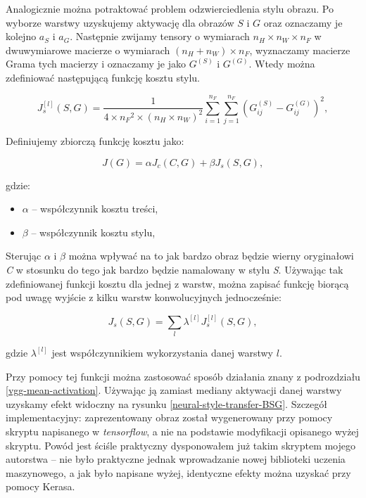 Analogicznie można potraktować problem odzwierciedlenia stylu obrazu. Po wyborze warstwy uzyskujemy aktywację dla obrazów \(S\) i \(G\) oraz oznaczamy je kolejno \(a_{S}\) i \(a_{G}\). 
Następnie zwijamy tensory o wymiarach \(n_H \times n_W \times n_F\) w dwuwymiarowe macierze o wymiarach \((n_H + n_W) \times n_F\),  wyznaczamy macierze Grama tych macierzy i oznaczamy je jako 
\(G^{(S)}\) i \(G^{(G)}\). Wtedy można zdefiniować następującą funkcję kosztu stylu.

\[J_{s}^{[l]}(S,G) = \frac{1}{4 \times {n_F}^2 \times (n_H \times n_W)^2} \sum _{i=1}^{n_F}\sum_{j=1}^{n_F}(G^{(S)}_{ij} - G^{(G)}_{ij})^2 ,\tag{12}\]

Definiujemy zbiorczą funkcję kosztu jako:

\[J(G) = \alpha J_{c}(C,G) + \beta J_{s}(S,G), \tag{13}\]

gdzie:
\begin{itemize}
\item
    \(\alpha\) -- współczynnik kosztu treści,
\item
    \(\beta\) -- współczynnik kosztu stylu,
\end{itemize}

Sterując \(\alpha\) i \(\beta\) można wpływać na to jak bardzo obraz będzie wierny oryginałowi \textit{C} w stosunku do tego jak bardzo będzie namalowany w stylu \textit{S}. Używając tak zdefiniowanej funkcji kosztu dla jednej 
z warstw, można zapisać funkcję biorącą pod uwagę wyjście z kilku warstw konwolucyjnych jednocześnie: 

\[J_{s}(S,G) = \sum_{l} \lambda^{[l]} J^{[l]}_{s}(S,G), \tag{14}\]

gdzie \(\lambda^{[l]}\) jest współczynnikiem wykorzystania danej warstwy \(l\).

Przy pomocy tej funkcji można zastosować sposób działania znany z podrozdziału \ref{vgg-mean-activation}. Używając ją zamiast mediany aktywacji danej warstwy uzyskamy efekt widoczny na rysunku \ref{neural-style-transfer-BSG}. Szczegół implementacyjny: zaprezentowany obraz został wygenerowany przy pomocy skryptu napisanego w \textit{tensorflow}, a nie na podstawie modyfikacji opisanego wyżej skryptu.
Powód jest ściśle praktyczny dysponowałem już takim skryptem mojego autorstwa -- nie było praktyczne jednak wprowadzanie nowej biblioteki uczenia maszynowego, a jak było napisane wyżej, identyczne efekty można uzyskać przy pomocy Kerasa.

